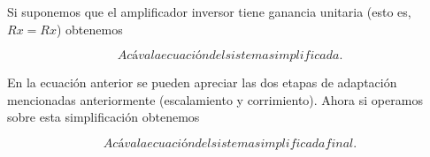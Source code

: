 Si suponemos que el amplificador inversor tiene ganancia unitaria (esto es, $Rx=Rx$) obtenemos

\begin{equation}[H]
    Acá va la ecuación del sistema simplificada.
    \label{fig:EJ6_ecuacion_sistema_simplificada} 
\end{equation}

En la ecuación anterior se pueden apreciar las dos etapas de adaptación mencionadas anteriormente (escalamiento y corrimiento). Ahora si operamos sobre esta simplificación obtenemos

\begin{equation}[H]
    Acá va la ecuación del sistema simplificada final.
    \label{fig:EJ6_ecuacion_sistema_simplificada_final} 
\end{equation}

